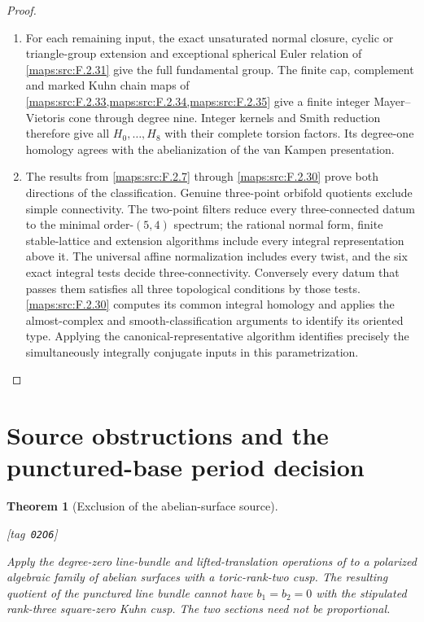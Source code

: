 \documentclass[11pt,a4paper]{article}
\numberwithin{equation}{section}
\newtheorem{theorem}{Theorem}[section]
\theoremstyle{definition}
\newcommand{\StatementRecord}[4]{{\upshape\footnotesize[tag~\texttt{#3}]}\enspace\ignorespaces}
\begin{document}
\begin{proof}
\begin{enumerate}[label=\arabic*.]
\item For each remaining input, the exact unsaturated normal
closure, cyclic or triangle-group extension and exceptional
spherical Euler relation of \ref{maps:src:F.2.31} give the full fundamental
group.  The finite cap, complement and marked Kuhn chain
maps of \cref{maps:src:F.2.33,maps:src:F.2.34,maps:src:F.2.35} give a finite integer Mayer--Vietoris cone
through degree nine.  Integer kernels and Smith reduction
therefore give all $H_0,\ldots,H_8$ with their complete
torsion factors. Its degree-one homology agrees with the
abelianization of the van Kampen presentation.

\item The results from \cref{maps:src:F.2.7} through \cref{maps:src:F.2.30} prove both directions of the classification.  Genuine three-point orbifold quotients
exclude simple connectivity.  The two-point filters reduce
every three-connected datum to the minimal order-$(5,4)$ spectrum; the
rational normal form, finite stable-lattice and extension
algorithms include every integral representation above it.
The universal affine normalization includes every twist,
and the six exact integral tests decide three-connectivity. Conversely every datum that passes them satisfies all three
topological conditions by those tests.  \ref{maps:src:F.2.30} computes
its common integral homology and applies the almost-complex
and smooth-classification arguments to identify its oriented
type. Applying the canonical-representative algorithm identifies
precisely the simultaneously integrally conjugate inputs in this
parametrization.

\end{enumerate}
\end{proof}




\section{Source obstructions and the punctured-base period decision}\label{pub:V:sec-oka}



\begin{theorem}[Exclusion of the abelian-surface source]\hypertarget{tag-02O6}{}\label{maps:src:F.3.4}
\StatementRecord{maps:src:F.3.4}{proved}{02O6}{\cref{maps:src:F.3.1}; \cite[Definition 4.2.4 and Proposition 4.2.5, p.~44; Theorem 4.2.6, p.~45]{ffDeligne}}


Apply the degree-zero line-bundle and lifted-translation operations of
\cite[\S2, Definitions~2.3 and~2.5, p.~5; Remark~8.5, p.~24]{E26}
to a polarized algebraic family of abelian surfaces with a
toric-rank-two cusp. The resulting quotient of the punctured
line bundle cannot have $b_1=b_2=0$ with the stipulated
rank-three square-zero Kuhn cusp.
The two sections need not be proportional.

\end{theorem}
\end{document}
